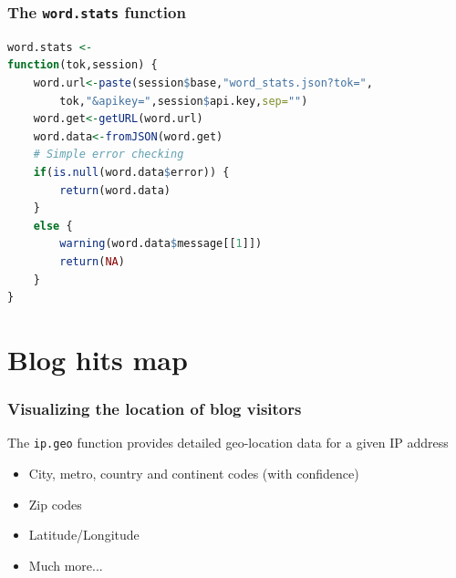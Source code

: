 \documentclass[xcolor=dvipsnames, 9pt,handout]{beamer}
\begin{document}
\begin{frame}[fragile]
    \frametitle{The \texttt{word.stats} function}
    \begin{lstlisting}[language=R]
word.stats <-
function(tok,session) {
    word.url<-paste(session$base,"word_stats.json?tok=",
        tok,"&apikey=",session$api.key,sep="")
    word.get<-getURL(word.url)
    word.data<-fromJSON(word.get)
    # Simple error checking
    if(is.null(word.data$error)) {
        return(word.data)
    }
    else {
        warning(word.data$message[[1]])
        return(NA)
    }
}    
    \end{lstlisting}
\end{frame}



\section{Blog hits map} %
\label{sec:blog_hits_map}

\begin{frame}[fragile]
    \frametitle{Visualizing the location of blog visitors}
    The \texttt{ip.geo} function provides detailed geo-location data for a given IP address
    \begin{itemize}
        \item City, metro, country and continent codes (with confidence)
        \item Zip codes
        \item Latitude/Longitude
        \item Much more...
    \end{itemize}
\end{frame}
\end{document}
